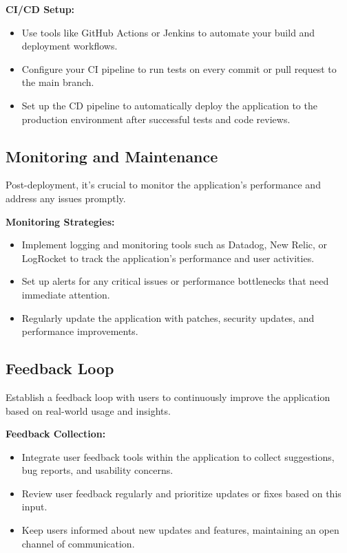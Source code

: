 \textbf{CI/CD Setup:}
\begin{itemize}
    \item Use tools like GitHub Actions or Jenkins to automate your build and deployment workflows.
    \item Configure your CI pipeline to run tests on every commit or pull request to the main branch.
    \item Set up the CD pipeline to automatically deploy the application to the production environment after successful tests and code reviews.
\end{itemize}

\subsection*{Monitoring and Maintenance}
Post-deployment, it's crucial to monitor the application's performance and address any issues promptly.

\textbf{Monitoring Strategies:}
\begin{itemize}
    \item Implement logging and monitoring tools such as Datadog, New Relic, or LogRocket to track the application's performance and user activities.
    \item Set up alerts for any critical issues or performance bottlenecks that need immediate attention.
    \item Regularly update the application with patches, security updates, and performance improvements.
\end{itemize}

\subsection*{Feedback Loop}
Establish a feedback loop with users to continuously improve the application based on real-world usage and insights.

\textbf{Feedback Collection:}
\begin{itemize}
    \item Integrate user feedback tools within the application to collect suggestions, bug reports, and usability concerns.
    \item Review user feedback regularly and prioritize updates or fixes based on this input.
    \item Keep users informed about new updates and features, maintaining an open channel of communication.
\end{itemize}

